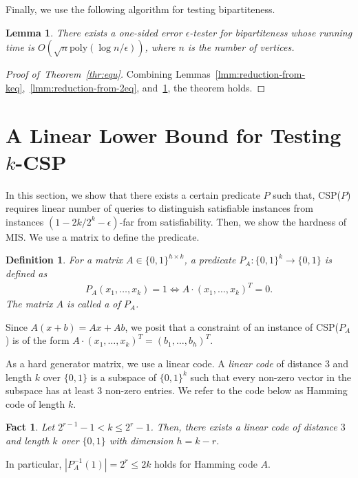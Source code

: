 \documentclass[letterpaper,11pt]{article}
\newtheorem{lemma}[theorem]{Lemma}
\newtheorem{fact}[theorem]{Fact}
\newtheorem{definition}[theorem]{Definition}
\newcommand{\poly}{\mathrm{poly}}
\newcommand{\bit}{\{0,1\}}
\newcommand{\mis}{\textsf{MIS}\xspace}
\newcommand{\kcsp}{\textsf{$k$-CSP}\xspace}
\newcommand{\csp}[1]{\textsf{CSP}(#1)\xspace}
\begin{document}
Finally, we use the following algorithm for testing bipartiteness.
\begin{lemma}\cite{GR99}\label{lmm:bipartiteness}
  There exists a one-sided error $\epsilon$-tester for bipartiteness whose running time is $O(\sqrt{n}\poly(\log n/\epsilon))$,
  where $n$ is the number of vertices.
\end{lemma}
\begin{proof}[Proof of~Theorem~\ref{thr:equ}]
Combining Lemmas~\ref{lmm:reduction-from-keq},~\ref{lmm:reduction-from-2eq}, and~\ref{lmm:bipartiteness}, 
the theorem holds.
\end{proof}

\section{A Linear Lower Bound for Testing \kcsp}\label{apx:kcsp}
In this section, 
we show that there exists a certain predicate $P$ such that,
\csp{$P$} requires linear number of queries to distinguish satisfiable instances from instances $(1-2k/2^k-\epsilon)$-far from satisfiability.
Then, we show the hardness of \mis.
We use a matrix to define the predicate.
\begin{definition}
  For a matrix $A\in \bit^{h\times k}$, a predicate $P_A:\bit^k\to\bit$ is defined as
  \begin{eqnarray*}
    P_A(x_1,\ldots,x_k)=1  \Leftrightarrow  A\cdot(x_1,\ldots,x_k)^T=0.
  \end{eqnarray*}
  The matrix $A$ is called a  of $P_A$.
\end{definition}
Since $A (x+b) = A x + A  b$, 
we posit that a constraint of an instance of \csp{$P_A$} is of the form $A\cdot (x_1,\ldots,x_k)^T=(b_1,\ldots,b_h)^T$.

As a hard generator matrix, we use a linear code.
A \textit{linear code} of distance $3$ and length $k$ over $\bit$ is a subspace of $\bit^k$ such that every non-zero vector in the subspace has at least $3$ non-zero entries.
We refer to the code below as Hamming code of length $k$.
\begin{fact}
  Let $2^{r-1}-1< k\leq 2^r-1$.
  Then, there exists a linear code of distance $3$ and length $k$ over $\bit$ with dimension $h=k-r$.
\end{fact}
In particular, $|P_A^{-1}(1)|=2^r\leq 2k$ holds for Hamming code $A$.
\end{document}
